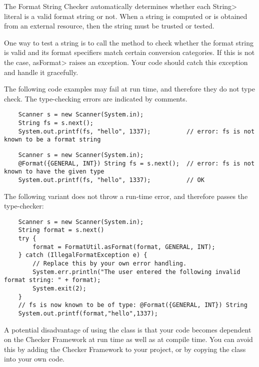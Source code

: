 
The Format String Checker automatically determines whether each \<String>
literal is a valid format string or not.  When a string is computed or is
obtained from an external resource, then the string must be trusted or tested.

One way to test a string is to call the
method to check whether the format string is valid and its format
specifiers match certain conversion categories.
If this is not the case, \<asFormat> raises an exception.  Your code should
catch this exception and handle it gracefully.

The following code examples may fail at run time, and therefore they do not
type check.  The type-checking errors are indicated by comments.

\begin{Verbatim}
    Scanner s = new Scanner(System.in);    
    String fs = s.next();
    System.out.printf(fs, "hello", 1337);          // error: fs is not known to be a format string
\end{Verbatim}

\begin{Verbatim}
    Scanner s = new Scanner(System.in);    
    @Format({GENERAL, INT}) String fs = s.next();  // error: fs is not known to have the given type
    System.out.printf(fs, "hello", 1337);          // OK
\end{Verbatim}

\noindent The following variant does not throw a run-time error, and
therefore passes the type-checker:

\begin{Verbatim}
    Scanner s = new Scanner(System.in);
    String format = s.next()
    try {
        format = FormatUtil.asFormat(format, GENERAL, INT);
    } catch (IllegalFormatException e) {
        // Replace this by your own error handling.
        System.err.println("The user entered the following invalid format string: " + format);
        System.exit(2);
    }
    // fs is now known to be of type: @Format({GENERAL, INT}) String
    System.out.printf(format,"hello",1337); 
\end{Verbatim}

\noindent A potential disadvantage of using the  class is that your code becomes
dependent on the Checker Framework at run time as well as at compile time. You
can avoid this by adding the Checker Framework to your project, or by copying
the  class into your own code.

